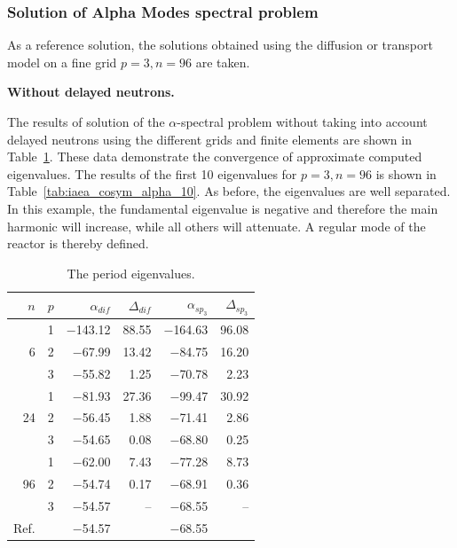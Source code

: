 \documentclass[authoryear]{elsarticle}
\begin{document}
\subsubsection{Solution of Alpha Modes spectral problem}
As a reference solution, the solutions obtained using the diffusion or transport model on a fine grid $ p = 3, n = 96 $ are taken.

\textbf{Without delayed neutrons.}

The results of solution of the $\alpha$-spectral problem without taking into account delayed neutrons using the different grids and finite elements are shown in Table~\ref{tab:iaea_cosym_alpha}.
These data demonstrate the convergence of approximate computed eigenvalues.
The results of the first 10 eigenvalues for $ p = 3, n = 96 $ is shown in Table~\ref{tab:iaea_cosym_alpha_10}.
As before, the eigenvalues are well separated.
In this example, the fundamental eigenvalue is negative and therefore the main harmonic will increase, while all others will attenuate. 
A regular mode of the reactor is thereby defined.

\begin{table}[h]
\caption{The period eigenvalues.}
\label{tab:iaea_cosym_alpha}
\begin{center}
\begin{tabular}{rrrrrr}
\hline
$n$ & $p$ & $\alpha_{dif}$ & $\Delta_{dif}$ &$\alpha_{sp_3}$& $\Delta_{sp_3}$ \\
\hline
	& 1	&$-$143.12 &  88.55 & $-$164.63& 96.08\\
6	& 2	& $-$67.99 &  13.42 & $-$84.75 & 16.20\\
	& 3	& $-$55.82 &   1.25 & $-$70.78 &  2.23\\ 
\hline
	& 1	& $-$81.93 &  27.36 & $-$99.47 & 30.92\\
24& 2	& $-$56.45 &   1.88 & $-$71.41 & 2.86\\
	& 3	& $-$54.65 &   0.08 & $-$68.80 & 0.25\\ 
\hline
	& 1	& $-$62.00 &   7.43 & $-$77.28 & 8.73\\
96& 2	& $-$54.74 &   0.17 & $-$68.91 & 0.36\\
	& 3	& $-$54.57 &	   -- & $-$68.55 & -- \\ 
\hline
Ref.& & $-$54.57 & & $-$68.55 \\ 
\hline
\end{tabular}
\end{center}
\end{table}
\end{document}
